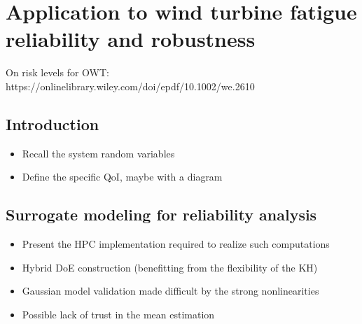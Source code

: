 \cleardoublepage
\chapter{Application to wind turbine fatigue reliability and robustness}
\label{chpt:7}
\hfill
\localtableofcontents
\newpage

On risk levels for OWT: https://onlinelibrary.wiley.com/doi/epdf/10.1002/we.2610


\section{Introduction}
\begin{itemize}
    \item Recall the system random variables
    \item Define the specific QoI, maybe with a diagram
\end{itemize}




\section{Surrogate modeling for reliability analysis}

\begin{itemize}
    \item Present the HPC implementation required to realize such computations
    \item Hybrid DoE construction (benefitting from the flexibility of the KH)
    \item Gaussian model validation made difficult by the strong nonlinearities
    \item Possible lack of trust in the mean estimation
\end{itemize}

